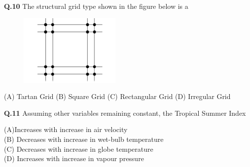 \documentclass[journal,12pt,onecolumn]{IEEEtran}
\theoremstyle{remark}
\begin{document}
\vspace{0.5cm}

\noindent \textbf{Q.10} \hspace{0.5cm} The structural grid type shown in the figure below is a

\vspace{0.2cm}
\begin{figure}[h!]
    \centering
    \includegraphics[width=0.25\linewidth]{Figs/10.png}
 
\end{figure}



\begin{center}
\hspace{1cm}
(A) Tartan Grid \hspace{1cm} (B) Square Grid \hspace{1cm} (C) Rectangular Grid \hspace{1cm} (D) Irregular Grid
\end{center}

\vspace{0.4cm}

\noindent \textbf{Q.11} \hspace{0.5cm} Assuming other variables remaining constant, the Tropical Summer Index
\vspace{0.05cm}


\begin{flushleft}
  \hspace{1.4cm} (A)Increases with increase in air velocity \\
  \hspace{1.5cm}(B) Decreases with increase in wet-bulb temperature \\
  \hspace{1.5cm}(C) Decreases with increase in globe temperature \\
  \hspace{1.5cm}(D) Increases with increase in vapour pressure
\end{flushleft}

\vspace{0.15cm}
\end{document}
